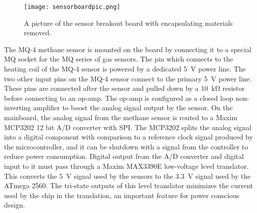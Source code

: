 \documentclass[journal]{IEEEtran}
\begin{document}
%
%
%


\begin{figure}[!t]
	\centering
	\texttt{[image: sensorboardpic.png]}
	\caption[Sensor breakout board]{A picture of the sensor breakout board with encapsulating materials removed.}
	\label{fig:sensorboardpic}
\end{figure}

The MQ-4 methane sensor is mounted on the board by connecting it to a special MQ socket for the MQ series of gas sensors.  The pin which connects to the heating coil of the MQ-4 sensor is powered by a dedicated \SI{5}{\volt} power line.  The two other input pins on the MQ-4 sensor connect to the primary \SI{5}{\volt} power line.  These pins are connected after the sensor and pulled down by a \SI{10}{\kilo\ohm} resistor before connecting to an op-amp.  The op-amp is configured as a closed loop non-inverting amplifier to boost the analog signal output by the sensor.  On the mainboard, the analog signal from the methane sensor is routed to a Maxim MCP3202 12 bit A/D converter with SPI.  The MCP3202 splits the analog signal into a digital component with comparison to a reference clock signal produced by the microcontroller, and it can be shutdown with a signal from the controller to reduce power consumption.  Digital output from the A/D converter and digital input to it must pass through a Maxim MAX3390E low-voltage level translator.  This converts the \SI{5}{\volt} signal used by the sensors to the \SI{3.3}{\volt} signal used by the ATmega 2560.  The tri-state outputs of this level translator minimizes the current used by the chip in the translation, an important feature for power conscious design.  
\end{document}
